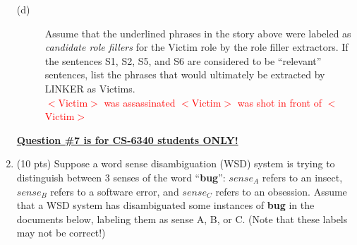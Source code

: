 \documentclass[11pt]{article}
\begin{document}
\begin{enumerate}
\begin{description}
\item[(d)] Assume that the underlined phrases in the story above were
labeled as {\it candidate role fillers} for the Victim role by the
role filler extractors. If the sentences S1, S2, S5, and S6 are
considered to be ``relevant'' sentences, list the phrases that would ultimately be
extracted by LINKER as Victims. \\


\textcolor{red}{$<$Victim$>$ was assassinated}
\textcolor{red}{$<$Victim$>$ was shot}
\textcolor{red}{in front of $<$Victim$>$ }
\end{description}


\newpage

\underline{\textbf{Question \#7 is for CS-6340 students ONLY!}}  \\

\item (10 pts) Suppose a word sense disambiguation (WSD) system is
  trying to distinguish between 3 senses of the word ``{\bf bug}'':
  $sense_A$ refers to an insect, $sense_B$ refers to a software error,
  and $sense_C$ refers to an obsession. Assume that a WSD system has
  disambiguated some instances of {\bf bug} in the documents below,
  labeling them as sense A, B, or C. (Note that these labels may not be correct!) 


\end{enumerate}
\end{document}
